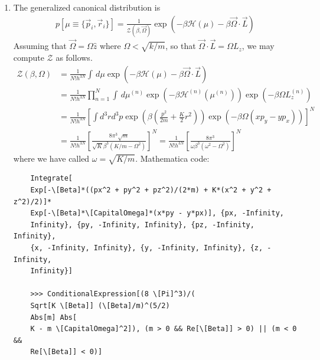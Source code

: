 \documentclass{article}
\theoremstyle{definition}
\newcommand{\ham}{\mathcal{H}}
\newcommand{\be}{\beta}
\newcommand{\f}[2]{\frac{#1}{#2}}
\newcommand{\lp}{\left(}
\newcommand{\rp}{\right)}
\newcommand{\lb}{\left[}
\newcommand{\rb}{\right]}
\begin{document}
\begin{enumerate}[label=(\alph*)]
	
	\item The generalized canonical distribution is 
	\begin{align*}
	p[\mu \equiv \{ \vec{p}_i ,\vec{r}_i \}] = \f{1}{\mathcal{Z}(\be,\vec{\Omega})} \exp\lp -\be \ham(\mu) - \be \vec{\Omega}\cdot \vec{L} \rp 
	\end{align*}
	Assuming that $\vec{\Omega}  =\Omega \hat{z}$ where $\Omega < \sqrt{k/m}$, so that $\vec{\Omega} \cdot \vec{L} = \Omega L_z$, we may compute $\mathcal{Z}$ as follows. 
	\begin{align*}
	\mathcal{Z}(\be,\Omega) 
	&= \f{1}{N! h^{3N}}\int\,d\mu  \exp\lp -\be \ham(\mu) - \be \vec{\Omega}\cdot \vec{L} \rp \\
	&= \f{1}{N! h^{3N}}\prod^N_{n=1} \int\,d\mu^{(n)} \exp\lp -\be \ham^{(n)}(\mu^{(n)})\rp \exp\lp - \beta \Omega L_z^{(n)}  \rp\\
	&= \f{1}{N! h^{3N}}\lb \int d^3 r d^3 p \exp\lp \beta \lp \f{p^2}{2m} + \f{K}{2}r^2 \rp \rp \exp\lp -\be\Omega(xp_y - y p_x)  \rp  \rb^N  \\
	&= \f{1}{N! h^{3N}}\lb \f{8\pi^3 \sqrt{m}}{\sqrt{K}\be^{3}  (K/m-\Omega^2)}\rb^N = \boxed{\f{1}{N! h^{3N}}\lb \f{8\pi^3}{\omega\be^{3}  (\omega^2-\Omega^2)}\rb^N}
	\end{align*}
	where we have called $\omega = \sqrt{K/m}$. Mathematica code:
	\begin{lstlisting}
	Integrate[
	Exp[-\[Beta]*((px^2 + py^2 + pz^2)/(2*m) + K*(x^2 + y^2 + z^2)/2)]*
	Exp[-\[Beta]*\[CapitalOmega]*(x*py - y*px)], {px, -Infinity, 
	Infinity}, {py, -Infinity, Infinity}, {pz, -Infinity, Infinity},
	{x, -Infinity, Infinity}, {y, -Infinity, Infinity}, {z, -Infinity, 
	Infinity}]
	
	>>> ConditionalExpression[(8 \[Pi]^3)/(
	Sqrt[K \[Beta]] (\[Beta]/m)^(5/2)
	Abs[m] Abs[
	K - m \[CapitalOmega]^2]), (m > 0 && Re[\[Beta]] > 0) || (m < 0 && 
	Re[\[Beta]] < 0)]
	\end{lstlisting}
	

\end{enumerate}
\end{document}
